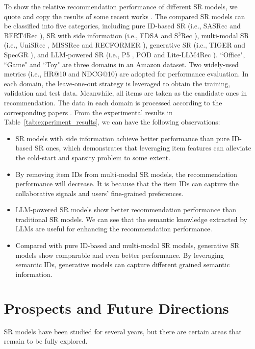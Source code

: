 \documentclass[review]{fcs}
\begin{document}
To show the relative recommendation performance of different SR models, we quote and copy the results of some recent works \cite{MISSRec,SpecGR,Lite-LLM4Rec}. The compared SR models can be classified into five categories, including pure ID-based SR (i.e., SASRec \cite{SASRec} and BERT4Rec \cite{BERT4Rec}), SR with side information (i.e., FDSA \cite{FDSA} and S$^{3}$Rec \cite{S3-Rec}), multi-modal SR (i.e., UniSRec \cite{UniSRec}, MISSRec \cite{MISSRec} and RECFORMER \cite{RECFORMER}), generative SR (i.e., TIGER \cite{TIGER} and SpecGR \cite{SpecGR}), and LLM-powered SR (i.e., P5 \cite{P5}, POD \cite{POD} and Lite-LLM4Rec \cite{Lite-LLM4Rec}). ``Office", ``Game" and ``Toy" are three domains in an Amazon dataset. Two widely-used metrics (i.e., HR@10 and NDCG@10) are adopted for performance evaluation. In each domain, the leave-one-out strategy is leveraged to obtain the training, validation and test data. Meanwhile, all items are taken as the candidate ones in recommendation. The data in each domain is processed according to the corresponding papers \cite{MISSRec,SpecGR,Lite-LLM4Rec}. From the experimental results in Table~\ref{tab:experiment_results}, we can have the following observations:
	\begin{itemize}
		\item SR models with side information achieve better performance than pure ID-based SR ones, which demonstrates that leveraging item features can alleviate the cold-start and sparsity problem to some extent.
		\item By removing item IDs from multi-modal SR models, the recommendation performance will decrease. It is because that the item IDs can capture the collaborative signals and users' fine-grained preferences.
		\item LLM-powered SR models show better recommendation performance than traditional SR models. We can see that the semantic knowledge extracted by LLMs are useful for enhancing the recommendation performance.
		\item Compared with pure ID-based and multi-modal SR models, generative SR models show comparable and even better performance. By leveraging semantic IDs, generative models can capture different grained semantic information.
	\end{itemize}
	\section{Prospects and Future Directions}\label{sec:prospects_and_future_directions}
	SR models have been studied for several years, but there are certain areas that remain to be fully explored.
\end{document}
